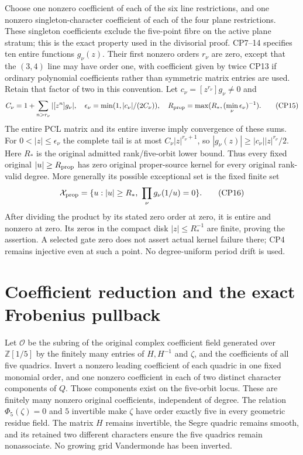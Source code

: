 Choose one nonzero coefficient of each of the six line restrictions,
and one nonzero singleton-character coefficient of each of the four
plane restrictions. These singleton coefficients exclude the five-point
fibre on the active plane stratum; this is the exact property used in
the divisorial proof. CP7--14 specifies ten entire functions $g_\nu(z)$.
Their first nonzero orders $r_\nu$ are zero, except that the
$(3,4)$ line may have order one, with coefficient given by twice
CP13 if ordinary polynomial coefficients rather than symmetric
matrix entries are used. Retain that factor of two in this convention.
Let $c_\nu=[z^{r_\nu}]g_\nu\ne0$ and
\[
 C_\nu=1+\sum_{n>r_\nu}|[z^n]g_\nu|,\quad
 \epsilon_\nu=\min(1,|c_\nu|/(2C_\nu)),\quad
 R_{\rm prop}=\max(R_*,(\min_\nu\epsilon_\nu)^{-1}).              \tag{CP15}
\]
The entire PCL matrix and its entire inverse imply convergence of
these sums. For $0<|z|\le\epsilon_\nu$ the complete tail is at most
$C_\nu|z|^{r_\nu+1}$, so $|g_\nu(z)|\ge|c_\nu||z|^{r_\nu}/2$.
Here $R_*$ is the original admitted rank/five-orbit lower bound.
Thus every fixed original $|u|\ge R_{\rm prop}$ has zero original
proper-source kernel for every original rank-valid degree.
More generally its possible exceptional set is the fixed finite set
\[
 \mathcal X_{\rm prop}=\{u:|u|\ge R_*,\ \prod_\nu g_\nu(1/u)=0\}.
                                                                    \tag{CP16}
\]
After dividing the product by its stated zero order at zero, it is
entire and nonzero at zero. Its zeros in the compact disk
$|z|\le R_*^{-1}$ are finite, proving the assertion. A selected
gate zero does not assert actual kernel failure there; CP4 remains
injective even at such a point. No degree-uniform period drift is used.

\section{Coefficient reduction and the exact Frobenius pullback}
Let $\mathcal O$ be the subring of the original complex coefficient
field generated over $\mathbb Z[1/5]$ by the finitely many entries
of $H,H^{-1}$ and $\zeta$, and the coefficients of all five quadrics.
Invert a nonzero leading coefficient of each quadric in one fixed
monomial order, and one nonzero coefficient in each of two distinct
character components of $Q$. Those components exist on the five-orbit
locus. These are finitely many nonzero original coefficients, independent
of degree. The relation $\Phi_5(\zeta)=0$ and $5$ invertible make
$\zeta$ have order exactly five in every geometric residue field.
The matrix $H$ remains invertible, the Segre quadric remains smooth,
and its retained two different characters ensure the five quadrics
remain nonassociate. No growing grid Vandermonde has been inverted.

